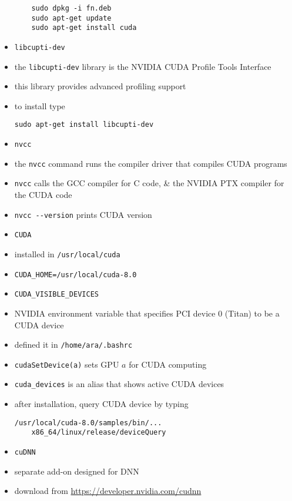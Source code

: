 \documentclass[twocolumn]{IEEEtran} %
\begin{document}
\begin{itemize}
\begin{verbatim}
    sudo dpkg -i fn.deb
    sudo apt-get update
    sudo apt-get install cuda
\end{verbatim}
    \item  \verb|libcupti-dev|
    \bi
        \item  the \verb|libcupti-dev| library is the NVIDIA CUDA Profile Tools Interface
        \item this library provides advanced profiling support
        \item to install type
\begin{verbatim}
sudo apt-get install libcupti-dev
\end{verbatim}
    \ei
    \item \verb|nvcc|
        \bi
            \item the \verb|nvcc| command runs the compiler driver that compiles CUDA programs
            \item \verb|nvcc| calls the GCC compiler for C code, \& the NVIDIA PTX compiler for the CUDA code
            \item \verb|nvcc --version| prints CUDA version
        \ei
    \ei
    \item \verb|CUDA|
    \bi
        \item installed in \verb|/usr/local/cuda|
        \bi
            \item \verb|CUDA_HOME=/usr/local/cuda-8.0|
        \ei
        \item \verb|CUDA_VISIBLE_DEVICES|
        \bi
            \item NVIDIA environment variable that specifies PCI device $0$ (Titan) to be a CUDA device
            \item defined it in \verb|/home/ara/.bashrc|
        \ei
        \item \verb|cudaSetDevice(a)| sets GPU $a$ for CUDA computing
        \item \verb|cuda_devices| is an alias that shows active CUDA devices
        \item after installation, query CUDA device by typing
        \begin{verbatim}
/usr/local/cuda-8.0/samples/bin/...
    x86_64/linux/release/deviceQuery
        \end{verbatim}
    \ei
    \item \verb|cuDNN|
    \bi
        \item separate add-on designed for DNN
        \item download from \url{https://developer.nvidia.com/cudnn}

\end{itemize}
\end{document}

